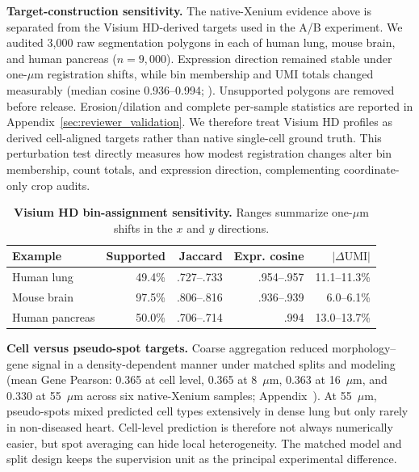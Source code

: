 \documentclass[sigconf,review]{acmart}
\begin{document}
\noindent\textbf{Target-construction sensitivity.}
The native-Xenium evidence above is separated from the Visium HD-derived
targets used in the A/B experiment. We audited 3{,}000 raw segmentation
polygons in each of human lung, mouse brain, and human pancreas
(\(n=9{,}000\)). Expression direction remained stable under one-\(\mu\)m
registration shifts, while bin membership and UMI totals changed measurably
(median cosine 0.936--0.994; ). Unsupported polygons are
removed before release. Erosion/dilation and complete per-sample statistics are
reported in Appendix~\ref{sec:reviewer_validation}. We therefore treat Visium
HD profiles as derived cell-aligned targets rather than native single-cell
ground truth.
This perturbation test directly measures how modest registration changes alter
bin membership, count totals, and expression direction, complementing
coordinate-only crop audits.

\begin{table}[t]
\centering
\small
\setlength{\tabcolsep}{1.8pt}
\caption{\textbf{Visium HD bin-assignment sensitivity.} Ranges summarize
one-\(\mu\)m shifts in the \(x\) and \(y\) directions.}
\label{tab:main_hd_sensitivity}
\begin{tabular}{lrrrr}
\toprule
Example & Supported & Jaccard & Expr. cosine & \(|\Delta\mathrm{UMI}|\) \\
\midrule
Human lung & 49.4\% & .727--.733 & .954--.957 & 11.1--11.3\% \\
Mouse brain & 97.5\% & .806--.816 & .936--.939 & 6.0--6.1\% \\
Human pancreas & 50.0\% & .706--.714 & .994 & 13.0--13.7\% \\
\bottomrule
\end{tabular}
\end{table}

\noindent\textbf{Cell versus pseudo-spot targets.}
Coarse aggregation reduced morphology--gene signal in a density-dependent
manner under matched splits and modeling (mean Gene Pearson: 0.365 at cell
level, 0.365 at 8~\(\mu\)m, 0.363 at 16~\(\mu\)m, and 0.330 at
55~\(\mu\)m across six native-Xenium samples;
Appendix~). At 55~\(\mu\)m,
pseudo-spots mixed predicted cell types extensively in dense lung but only
rarely in non-diseased heart. Cell-level prediction is therefore not always
numerically easier, but spot averaging can hide local heterogeneity.
The matched model and split design keeps the supervision unit as the principal
experimental difference.
\end{document}

